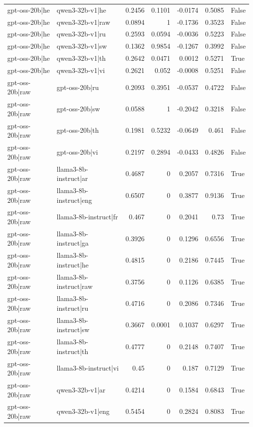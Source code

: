 \begin{table}
\begin{tabular}{l l r r r r l}
gpt-oss-20b|he & qwen3-32b-v1|he & 0.2456 & 0.1101 & -0.0174 & 0.5085 & False \\
gpt-oss-20b|he & qwen3-32b-v1|raw & 0.0894 & 1 & -0.1736 & 0.3523 & False \\
gpt-oss-20b|he & qwen3-32b-v1|ru & 0.2593 & 0.0594 & -0.0036 & 0.5223 & False \\
gpt-oss-20b|he & qwen3-32b-v1|sw & 0.1362 & 0.9854 & -0.1267 & 0.3992 & False \\
gpt-oss-20b|he & qwen3-32b-v1|th & 0.2642 & 0.0471 & 0.0012 & 0.5271 & True \\
gpt-oss-20b|he & qwen3-32b-v1|vi & 0.2621 & 0.052 & -0.0008 & 0.5251 & False \\
gpt-oss-20b|raw & gpt-oss-20b|ru & 0.2093 & 0.3951 & -0.0537 & 0.4722 & False \\
gpt-oss-20b|raw & gpt-oss-20b|sw & 0.0588 & 1 & -0.2042 & 0.3218 & False \\
gpt-oss-20b|raw & gpt-oss-20b|th & 0.1981 & 0.5232 & -0.0649 & 0.461 & False \\
gpt-oss-20b|raw & gpt-oss-20b|vi & 0.2197 & 0.2894 & -0.0433 & 0.4826 & False \\
gpt-oss-20b|raw & llama3-8b-instruct|ar & 0.4687 & 0 & 0.2057 & 0.7316 & True \\
gpt-oss-20b|raw & llama3-8b-instruct|eng & 0.6507 & 0 & 0.3877 & 0.9136 & True \\
gpt-oss-20b|raw & llama3-8b-instruct|fr & 0.467 & 0 & 0.2041 & 0.73 & True \\
gpt-oss-20b|raw & llama3-8b-instruct|ga & 0.3926 & 0 & 0.1296 & 0.6556 & True \\
gpt-oss-20b|raw & llama3-8b-instruct|he & 0.4815 & 0 & 0.2186 & 0.7445 & True \\
gpt-oss-20b|raw & llama3-8b-instruct|raw & 0.3756 & 0 & 0.1126 & 0.6385 & True \\
gpt-oss-20b|raw & llama3-8b-instruct|ru & 0.4716 & 0 & 0.2086 & 0.7346 & True \\
gpt-oss-20b|raw & llama3-8b-instruct|sw & 0.3667 & 0.0001 & 0.1037 & 0.6297 & True \\
gpt-oss-20b|raw & llama3-8b-instruct|th & 0.4777 & 0 & 0.2148 & 0.7407 & True \\
gpt-oss-20b|raw & llama3-8b-instruct|vi & 0.45 & 0 & 0.187 & 0.7129 & True \\
gpt-oss-20b|raw & qwen3-32b-v1|ar & 0.4214 & 0 & 0.1584 & 0.6843 & True \\
gpt-oss-20b|raw & qwen3-32b-v1|eng & 0.5454 & 0 & 0.2824 & 0.8083 & True \\

\end{tabular}
\end{table}
